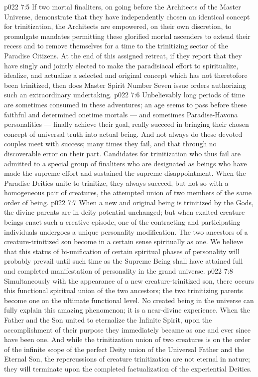 \vs p022 7:5 If two mortal finaliters, on going before the Architects of the Master Universe, demonstrate that they have independently chosen an identical concept for trinitization, the Architects are empowered, on their own discretion, to promulgate mandates permitting these glorified mortal ascenders to extend their recess and to remove themselves for a time to the trinitizing sector of the Paradise Citizens. At the end of this assigned retreat, if they report that they have singly and jointly elected to make the paradisiacal effort to spiritualize, idealize, and actualize a selected and original concept which has not theretofore been trinitized, then does Master Spirit Number Seven issue orders authorizing such an extraordinary undertaking.
\vs p022 7:6 Unbelievably long periods of time are sometimes consumed in these adventures; an age seems to pass before these faithful and determined onetime mortals --- and sometimes Paradise\hyp{}Havona personalities --- finally achieve their goal, really succeed in bringing their chosen concept of universal truth into actual being. And not always do these devoted couples meet with success; many times they fail, and that through no discoverable error on their part. Candidates for trinitization who thus fail are admitted to a special group of finaliters who are designated as beings who have made the supreme effort and sustained the supreme disappointment. When the Paradise Deities unite to trinitize, they always succeed, but not so with a homogeneous pair of creatures, the attempted union of two members of the same order of being.
\vs p022 7:7 \pc When a new and original being is trinitized by the Gods, the divine parents are in deity potential unchanged; but when exalted creature beings enact such a creative episode, one of the contracting and participating individuals undergoes a unique personality modification. The two ancestors of a creature\hyp{}trinitized son become in a certain sense spiritually as one. We believe that this status of bi\hyp{}unification of certain spiritual phases of personality will probably prevail until such time as the Supreme Being shall have attained full and completed manifestation of personality in the grand universe.
\vs p022 7:8 Simultaneously with the appearance of a new creature\hyp{}trinitized son, there occurs this functional spiritual union of the two ancestors; the two trinitizing parents become one on the ultimate functional level. No created being in the universe can fully explain this amazing phenomenon; it is a near\hyp{}divine experience. When the Father and the Son united to eternalize the Infinite Spirit, upon the accomplishment of their purpose they immediately became as one and ever since have been one. And while the trinitization union of two creatures is on the order of the infinite scope of the perfect Deity union of the Universal Father and the Eternal Son, the repercussions of creature trinitization are not eternal in nature; they will terminate upon the completed factualization of the experiential Deities.
